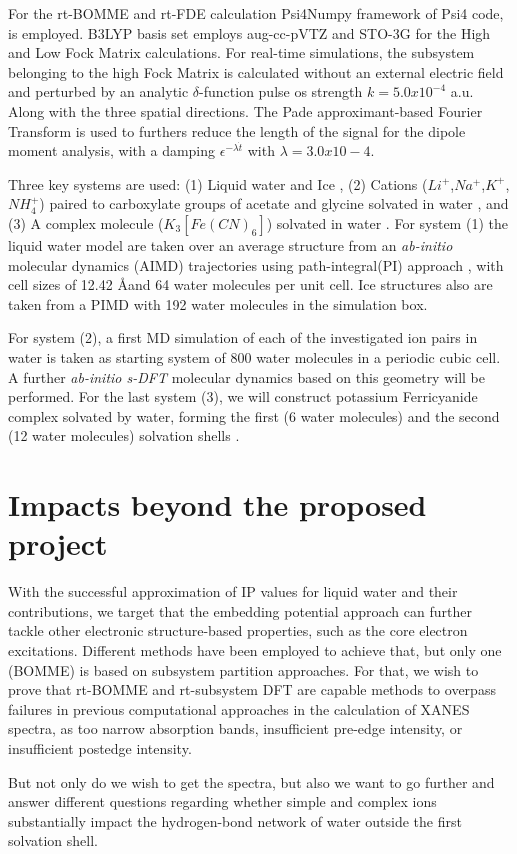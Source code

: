 \documentclass[notitlepage,12pt]{report}
\begin{document}
For the rt-BOMME and rt-FDE calculation Psi4Numpy\supercite{smith2018psi4numpy} framework of Psi4 code\supercite{smith2020psi4}, is employed. B3LYP basis set employs aug-cc-pVTZ and STO-3G for the High and Low Fock Matrix calculations. For real-time simulations, the subsystem belonging to the high Fock Matrix is calculated without an external electric field and perturbed by an analytic $\delta$-function pulse os strength $k=5.0x10^{-4}$ a.u. Along with the three spatial directions. The Pade approximant-based Fourier Transform is used to furthers reduce the length of the signal for the dipole moment analysis, with a damping $\epsilon^{-\lambda \dot{t}}$ with $\lambda=3.0x10-4$. 

Three key systems are used: (1) Liquid water\supercite{gaiduk2018electron} and Ice \supercite{bergmann2007nearest,zhovtobriukh2019x}, (2) Cations ($Li^{+}$,$Na^{+}$,$K^{+}$,$NH_4^{+}$) paired to carboxylate groups of acetate and glycine solvated in water \supercite{aziz2008cation}, and (3) A complex molecule ($K_3[Fe(CN)_6]$) solvated in water \supercite{zheng2018enabling}. For system (1) the liquid water model are taken over an average structure from an \textit{ab-initio} molecular dynamics (AIMD) trajectories using path-integral(PI) approach \supercite{gaiduk2018electron}, with cell sizes of 12.42 \AA and 64 water molecules per unit cell.  Ice structures also are taken from a PIMD with 192 water molecules in the simulation box\supercite{leetmaa2010theoretical}. 

For system (2), a first MD simulation of each of the investigated ion pairs in water is taken as starting system \supercite{aziz2008cation} of 800 water molecules in a periodic cubic cell. A further \textit{ab-initio s-DFT} molecular dynamics\supercite{genova2016avoiding} based on this geometry will be performed.  For the last system (3), we will construct potassium Ferricyanide complex solvated by water, forming the first (6 water molecules) and the second (12 water molecules) solvation shells \supercite{uudsemaa2003density,seidel2011valence}. 

\section{Impacts beyond the proposed project}

With the successful approximation of IP values for liquid water and their contributions, we target that the embedding potential approach can further tackle other electronic structure-based properties, such as the core electron excitations. Different methods have been employed to achieve that, but only one (BOMME) is based on subsystem partition approaches. For that, we wish to prove that rt-BOMME and rt-subsystem DFT are capable methods to overpass failures in previous computational approaches in the calculation of XANES spectra, as too narrow absorption bands, insufficient pre-edge intensity, or insufficient postedge intensity.

But not only do we wish to get the spectra, but also we want to go further and answer different questions regarding whether simple and complex ions substantially impact the hydrogen-bond network of water outside the first solvation shell. 
\printbibliography
\end{document}
